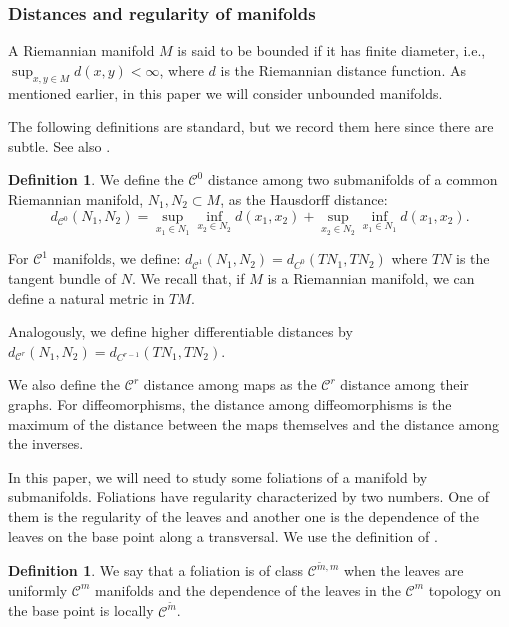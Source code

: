 \documentclass[11pt]{amsart}
\theoremstyle{definition}
\newtheorem{defn}[thm]{Definition}
\theoremstyle{remark}
\numberwithin{equation}{section}
\newcommand{\C}{\mathcal{C}}
\begin{document}
\subsubsection{Distances and regularity of   manifolds}
A  Riemannian manifold $M$ is said to be bounded if it has finite diameter, i.e., $\sup_{x,y\in M} d(x,y)<\infty$, where $d$ is the Riemannian distance function.
As mentioned earlier, in this paper we will consider unbounded manifolds.

The following definitions are standard, but we record them
here since there are subtle. See also
\cite{PughSW97}.



\begin{defn}\label{distance}
  We define the $\C^0$  distance among two submanifolds  of a common
  Riemannian manifold,   $N_1, N_2 \subset M$, as the Hausdorff distance:
  \[
  d_{\C^0}( N_1, N_2) =  \sup_{x_1 \in N_1} \inf_{x_2 \in N_2} d(x_1, x_2)
  +\sup_{x_2 \in N_2} \inf_{x_1 \in N_1} d(x_1, x_2) .
  \]


  For $\C^1$ manifolds, we define:
  $d_{\C^1}( N_1, N_2) = d_{C^0} (T N_1, T N_2) $
  where $TN$ is the tangent bundle of $N$.
  We recall that, if $M$ is a Riemannian manifold,
  we can define a natural metric in $TM$.

    Analogously, we define higher differentiable distances
    by
    $d_{\C^r}(N_1, N_2) = d_{C^{r-1}}( TN_1, TN_2)$.

    We also define the $\C^r$ distance among maps
    as the  $\C^r$ distance among their graphs.  For
    diffeomorphisms, the distance among diffeomorphisms
    is the maximum of the distance between the maps
    themselves and the distance among the inverses.
\end{defn}



In this paper, we will need to study some foliations of
a manifold  by submanifolds.
  Foliations have regularity characterized by two
  numbers. One of them is the regularity of the leaves
  and another one is the dependence of the  leaves on
  the base point along a  transversal.   We use the definition of \cite{HPS,PughSW97}.

  \begin{defn} \label{Ctildemm}
    We say that a foliation is of class $\C^{\tilde m, m}$
    when the leaves are uniformly $\C^m$ manifolds
    and the dependence of the leaves in the $\C^m$ topology on the base point   is locally $\C^{\tilde m}$.
  \end{defn}
\end{document}
